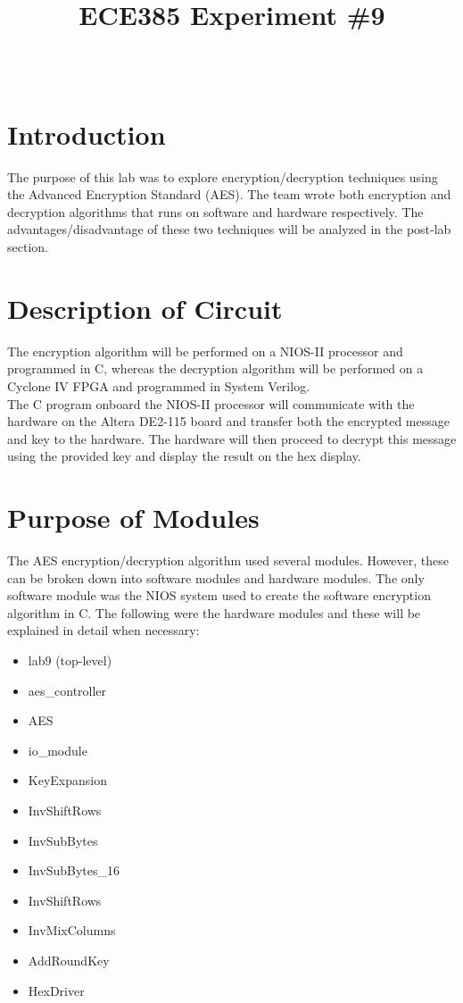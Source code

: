 \documentclass[journal, twocolumn, final,11pt,letterpaper]{IEEEtran}
\title{ECE385 Experiment \#9
	}
\author{
\IEEEauthorblockN{Eric Meyers, Ryan Helsdingen}\\
\IEEEauthorblockA{Section ABG; TAs: Ben Delay, Shuo Liu \\
April 13th, 2016 \\
emeyer7, helsdin2}}
\begin{document}
	
\maketitle
\singlespacing

\section{Introduction}
The purpose of this lab was to explore encryption/decryption techniques using the Advanced Encryption Standard (AES). The team wrote both encryption and decryption algorithms that runs on software and hardware respectively. The advantages/disadvantage of these two techniques will be analyzed in the post-lab section. 

\section{Description of Circuit}
The encryption algorithm will be performed on a NIOS-II processor and programmed in C, whereas the decryption algorithm will be performed on a Cyclone IV FPGA and programmed in System Verilog. \\

The C program onboard the NIOS-II processor  will communicate with the hardware on the Altera DE2-115 board and transfer both the encrypted message and key to the hardware. The hardware will then proceed to decrypt this message using the provided key and display the result on the hex display.

\section{Purpose of Modules}
The AES encryption/decryption algorithm used several modules. However, these can be broken down into software modules and hardware modules. The only software module was the NIOS system used to create the software encryption algorithm in C. The following were the hardware modules and these will be explained in detail when necessary:
\begin{itemize}
	\item lab9 (top-level)
	\item aes\_controller
	\item AES
	\item io\_module
	\item KeyExpansion
	\item InvShiftRows
	\item InvSubBytes
	\item InvSubBytes\_16
	\item InvShiftRows
	\item InvMixColumns
	\item AddRoundKey
	
	\item HexDriver
\end{itemize}
\end{document}
